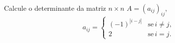 Calcule o determinante da matriz \(n\times n\) \(A=(a_{ij})_{ij}\),
\[a_{ij}=\begin{cases}
(-1)^{|i-j|} & \text{se}\, i\ne j,\\
2 & \text{se}\, i= j.
\end{cases}\]
